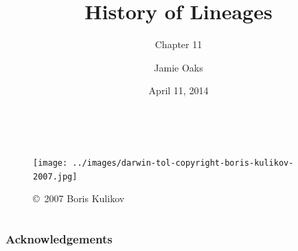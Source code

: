 



\title[History of Lineages]{History of Lineages}
\subtitle{Chapter 11}

\author[J.\ Oaks]{
    Jamie Oaks
}

\date{April 11, 2014}



\begin{frame}
    \begin{columns}[c]
            \maketitle
            \begin{figure}
                \begin{center}
                \texttt{[image: ../images/darwin-tol-copyright-boris-kulikov-2007.jpg]}
                \caption{\tiny \copyright~2007 Boris Kulikov}
                \end{center}
            \end{figure}
    \end{columns}
\end{frame}

\begin{frame}
    \frametitle{Acknowledgements}
\end{frame}

